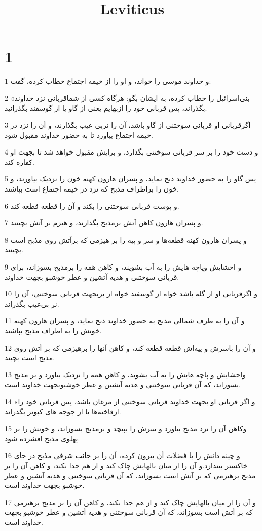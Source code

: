 

\title{Leviticus}

 
\chapter{1}

\par 1 و خداوند موسی را خواند، و او را از خیمه اجتماع خطاب کرده، گفت:
\par 2 «بنی‌اسرائیل را خطاب کرده، به ایشان بگو: هرگاه کسی از شماقربانی نزد خداوند بگذراند، پس قربانی خود را ازبهایم یعنی از گاو یا از گوسفند بگذرانید.
\par 3 اگرقربانی او قربانی سوختنی از گاو باشد، آن را نربی عیب بگذارند، و آن را نزد در خیمه اجتماع بیاورد تا به حضور خداوند مقبول شود.
\par 4 و دست خود را بر سر قربانی سوختنی بگذارد، و برایش مقبول خواهد شد تا بجهت او کفاره کند.
\par 5 پس گاو را به حضور خداوند ذبح نماید، و پسران هارون کهنه خون را نزدیک بیاورند، و خون را براطراف مذبح که نزد در خیمه اجتماع است بپاشند.
\par 6 و پوست قربانی سوختنی را بکند و آن را قطعه قطعه کند.
\par 7 و پسران هارون کاهن آتش برمذبح بگذارند، و هیزم بر آتش بچینند.
\par 8 و پسران هارون کهنه قطعه‌ها و سر و پیه را بر هیزمی که برآتش روی مذبح است بچینند.
\par 9 و احشایش وپاچه هایش را به آب بشویند، و کاهن همه را برمذبح بسوزاند، برای قربانی سوختنی و هدیه آتشین و عطر خوشبو بجهت خداوند.
\par 10 و اگرقربانی او از گله باشد خواه از گوسفند خواه از بزبجهت قربانی سوختنی، آن را نر بی‌عیب بگذراند.
\par 11 و آن را به طرف شمالی مذبح به حضور خداوند ذبح نماید، و پسران هارون کهنه خونش را به اطراف مذبح بپاشند.
\par 12 و آن را باسرش و پیه‌اش قطعه قطعه کند، و کاهن آنها را برهیزمی که بر آتش روی مذبح است بچیند.
\par 13 واحشایش و پاچه هایش را به آب بشوید، و کاهن همه را نزدیک بیاورد و بر مذبح بسوزاند، که آن قربانی سوختنی و هدیه آتشین و عطر خوشبوبجهت خداوند است.
\par 14 «و اگر قربانی او بجهت خداوند قربانی سوختنی از مرغان باشد، پس قربانی خود را ازفاخته‌ها یا از جوجه های کبوتر بگذراند.
\par 15 وکاهن آن را نزد مذبح بیاورد و سرش را بپیچد و برمذبح بسوزاند، و خونش را بر پهلوی مذبح افشرده شود.
\par 16 و چینه دانش را با فضلات آن بیرون کرده، آن را بر جانب شرقی مذبح در جای خاکستر بیندازد.و آن را از میان بالهایش چاک کند و از هم جدا نکند، و کاهن آن را بر مذبح برهیزمی که بر آتش است بسوزاند، که آن قربانی سوختنی و هدیه آتشین و عطر خوشبو بجهت خداوند است.
\par 17 و آن را از میان بالهایش چاک کند و از هم جدا نکند، و کاهن آن را بر مذبح برهیزمی که بر آتش است بسوزاند، که آن قربانی سوختنی و هدیه آتشین و عطر خوشبو بجهت خداوند است.
 
